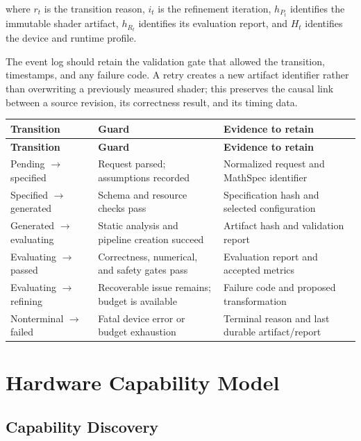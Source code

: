 \documentclass[11pt,a4paper,oneside]{report}
\begin{document}
where $r_t$ is the transition reason, $i_t$ is the refinement iteration, $h_{P_t}$ identifies
the immutable shader artifact, $h_{R_t}$ identifies its evaluation report, and $H_t$ identifies
the device and runtime profile.

The event log should retain the validation gate that allowed the transition, timestamps, and any
failure code. A retry creates a new artifact identifier rather than overwriting a previously
measured shader; this preserves the causal link between a source revision, its correctness result,
and its timing data.

\begin{longtable}{@{}>{\raggedright\arraybackslash}p{}>{\raggedright\arraybackslash}p{}>{\raggedright\arraybackslash}p{}@{}}
\toprule
\textbf{Transition} & \textbf{Guard} & \textbf{Evidence to retain}\\
\midrule
\endfirsthead
\toprule
\textbf{Transition} & \textbf{Guard} & \textbf{Evidence to retain}\\
\midrule
\endhead
Pending $\rightarrow$ specified & Request parsed; assumptions recorded & Normalized request and MathSpec identifier\\
Specified $\rightarrow$ generated & Schema and resource checks pass & Specification hash and selected configuration\\
Generated $\rightarrow$ evaluating & Static analysis and pipeline creation succeed & Artifact hash and validation report\\
Evaluating $\rightarrow$ passed & Correctness, numerical, and safety gates pass & Evaluation report and accepted metrics\\
Evaluating $\rightarrow$ refining & Recoverable issue remains; budget is available & Failure code and proposed transformation\\
Nonterminal $\rightarrow$ failed & Fatal device error or budget exhaustion & Terminal reason and last durable artifact/report\\
\bottomrule
\end{longtable}

\chapter{Hardware Capability Model}

\section{Capability Discovery}
\end{document}
